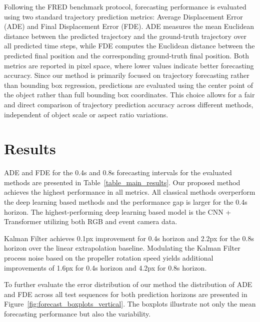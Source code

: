\documentclass[letterpaper, 10 pt, conference]{ieeeconf}  %
\begin{document}
Following the FRED benchmark protocol, forecasting performance is evaluated using two standard trajectory prediction metrics: Average Displacement Error (ADE) and Final Displacement Error (FDE).
ADE measures the mean Euclidean distance between the predicted trajectory and the ground-truth trajectory over all predicted time steps, while FDE computes the Euclidean distance between the predicted final position and the corresponding ground-truth final position. Both metrics are reported in pixel space, where lower values indicate better forecasting accuracy.  Since our method is primarily focused on trajectory forecasting rather than bounding box regression, predictions are evaluated using the center point of the object rather than full bounding box coordinates. This choice allows for a fair and direct comparison of trajectory prediction accuracy across different methods, independent of object scale or aspect ratio variations. 




\section{Results}\label{sec:experiments}

ADE and FDE for the 0.4s and 0.8s forecasting intervals for the evaluated methods are presented in Table~\ref{table_main_results}. Our proposed method achieves the highest performance in all metrics. All classical methods overperform the deep learning based methods and the performance gap is larger for the 0.4s horizon. The highest-performing deep learning based model is the CNN + Transformer utilizing both RGB and event camera data. 

Kalman Filter achieves 0.1px improvement for 0.4s horizon and 2.2px for the 0.8s horizon over the linear extrapolation baseline. Modulating the Kalman Filter process noise based on the propeller rotation speed yields additional improvements of 1.6px for 0.4s horizon and 4.2px for 0.8s horizon. 

To further evaluate the error distribution of our method the distribution of ADE and FDE across all test sequences for both prediction horizons are presented in 
Figure~\ref{fig:forecast_boxplots_vertical}. 
The boxplots illustrate not only the mean forecasting performance but also the variability. 
\end{document}
